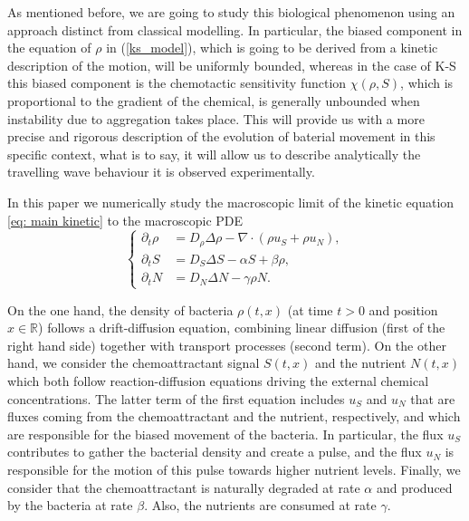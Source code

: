 \documentclass[11pt,twoside]{article}
\theoremstyle{nonumberplain}
\begin{document}
As mentioned before, we are going to study this biological phenomenon using an approach distinct from classical modelling. In particular, the biased component in the equation of $\rho$ in (\ref{ks_model}), which is going to be derived from a kinetic description of the motion, will be uniformly bounded, whereas in the case of K-S this biased component is the chemotactic sensitivity function $\chi(\rho, S)$, which is proportional to the gradient of the chemical, is generally unbounded when instability due to aggregation takes place. This will provide us with a more precise and rigorous description of the evolution of baterial movement in this specific context, what is to say, it will allow us to describe analytically the travelling wave behaviour it is observed experimentally.

In this paper we numerically study the macroscopic limit of the kinetic equation \eqref{eq: main kinetic} to the macroscopic PDE
\begin{equation}
  \left \{
    \begin{aligned}
       \partial_t \rho &= D_\rho \Delta \rho - \nabla \cdot (\rho u_S + \rho u_N),\\
       \partial_t S &= D_S \Delta S - \alpha S + \beta \rho,\\
        \partial_t N &= D_N \Delta N - \gamma \rho N.
    \end{aligned}
  \right .
  \label{basicmodel}
\end{equation}

On the one hand, the density of bacteria $\rho(t, x)$ (at time $t>0$ and position $x \in \mathbb{R} $) follows a drift-diffusion equation, combining linear diffusion (first of the right hand side) together with transport processes (second term). On the other hand, we consider the chemoattractant signal $S(t,x)$ and the nutrient $N(t,x)$ which both follow reaction-diffusion equations driving the external chemical concentrations. The latter term of the first equation includes $u_S$ and $u_N$ that are fluxes coming from the chemoattractant and the nutrient, respectively, and which are responsible for the biased movement of the bacteria. In particular, the flux $u_S$ contributes to gather the bacterial density and create a pulse, and the flux $u_N$ is responsible for the motion of this pulse towards higher nutrient levels.
Finally, we consider that the chemoattractant is naturally degraded at rate $\alpha$ and produced by the bacteria at rate $\beta$. Also, the nutrients are consumed at rate $\gamma$. 
\end{document}
